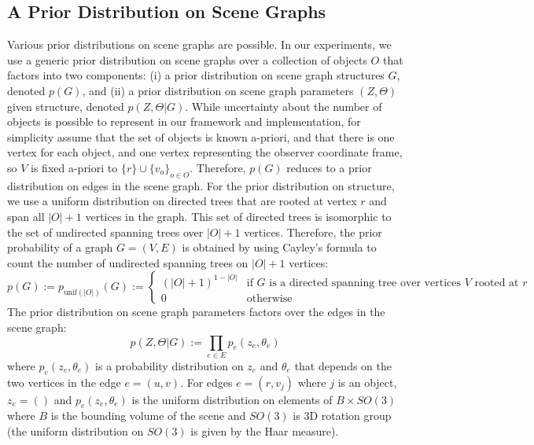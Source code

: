 \subsection{A Prior Distribution on Scene Graphs}  %
Various prior distributions on scene graphs are possible.
In our experiments, we use a generic prior distribution on scene graphs over a collection of objects $O$ that factors into two components:
(i) a prior distribution on scene graph structures $G$, denoted $p(G)$, and
(ii) a prior distribution on scene graph parameters $(Z, \Theta)$ given structure, denoted $p(Z, \Theta | G)$.
While uncertainty about the number of objects is possible to represent in our framework and implementation, for simplicity assume that the set of objects is known a-priori, and that there is one vertex for each object, and one vertex representing the observer coordinate frame, so $V$ is fixed a-priori to $\{r\} \cup \{v_o\}_{o \in O}$.
Therefore, $p(G)$ reduces to a prior distribution on edges in the scene graph.
For the prior distribution on structure, we use a uniform distribution on directed trees that are rooted at vertex $r$ and span all $|O| + 1$ vertices in the graph.
This set of directed trees is isomorphic to the set of undirected spanning trees over $|O| + 1$ vertices.
Therefore, the prior probability of a graph $G = (V, E)$ is obtained by using Cayley's formula to count the number of undirected spanning trees on $|O| +1$ vertices:
\begin{equation}
    p(G) := p_{\mathrm{unif}(|O|)}(G) := \left\{
    \begin{array}{ll}
    (|O| + 1)^{1 - |O|} & \mbox{if $G$ is a directed spanning tree over vertices $V$ rooted at $r$}\\
    0 & \mbox{otherwise}
    \end{array}
    \right.
\end{equation}
The prior distribution on scene graph parameters factors over the edges in the scene graph:
\begin{equation}
    p(Z, \Theta | G) := \prod_{e \in E} p_e(z_e, \theta_e)
\end{equation}
where $p_e(z_e, \theta_e)$ is a probability distribution on $z_e$ and $\theta_e$ that depends on the two vertices in the edge $e = (u, v)$.
For edges $e = (r, v_j)$ where $j$ is an object, $z_e = ()$ and $p_e(z_e, \theta_e)$ is the uniform distribution on elements of $B \times SO(3)$ where $B$ is the bounding volume of the scene and $SO(3)$ is 3D rotation group (the uniform distribution on $SO(3)$ is given by the Haar measure).
